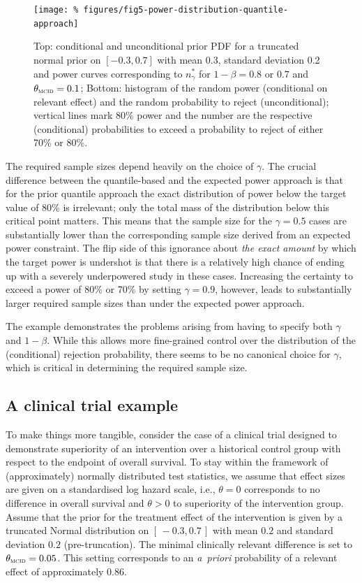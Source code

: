 \documentclass{article}
\begin{document}
\begin{figure}
    \centering
    \texttt{[image: \%
        figures/fig5-power-distribution-quantile-approach]}
    \caption{%
        Top: conditional and unconditional prior PDF for a truncated normal prior on $[-0.3, 0.7]$ with mean 0.3, standard deviation 0.2 and
        power curves corresponding to $n_{\gamma}^*$ for $1-\beta=0.8$ or $0.7$ and $\protect\mcid=0.1$;
        Bottom: histogram of the random power (conditional on relevant effect) and the random probability to reject (unconditional); vertical lines mark 80\% power and the number are the respective (conditional) probabilities to exceed a probability to reject of either 70\% or 80\%.
    }
    \label{fig:power-distribution-quantile-approach}
\end{figure}

The required sample sizes depend heavily on the choice of $\gamma$.
The crucial difference between the quantile-based and the expected power approach is that for the prior quantile approach the exact distribution of power below the target value of 80\% is irrelevant; only the total mass of the distribution below this critical point matters.
This means that the sample size for the $\gamma=0.5$ cases are substantially lower than the corresponding sample size derived from an expected power constraint.
The flip side of this ignorance about \emph{the exact amount} by which the target power is undershot is that there is a relatively high chance of ending up with a severely underpowered study in these cases.
Increasing the certainty to exceed a power of 80\% or 70\% by setting $\gamma=0.9$, however, leads to substantially larger required sample sizes than under the expected power approach.

The example demonstrates the problems arising from having to specify both $\gamma$ and $1-\beta$.
While this allows more fine-grained control over the distribution of the (conditional) rejection probability, there seems to be no canonical choice for $\gamma$, which is critical in determining the required sample size.


\subsection{A clinical trial example}
\label{sec:example:clinical-trial}

To make things more tangible, consider the case of a clinical trial designed to demonstrate superiority of an intervention over a historical control group with respect to the endpoint of overall survival.
To stay within the framework of (approximately) normally distributed test statistics, we assume that effect sizes are given on a standardised log hazard scale, i.e., $\theta=0$ corresponds to no difference in overall survival and $\theta>0$ to superiority of the intervention group.
Assume that the prior for the treatment effect of the intervention is given by a truncated Normal distribution on $[\,-0.3, 0.7\,]$ with mean $0.2$ and standard deviation $0.2$ (pre-truncation).
The minimal clinically relevant difference is set to $\mcid=0.05$.
This setting corresponds to an \textit{a~priori} probability of a relevant effect of approximately $0.86$.
\end{document}

